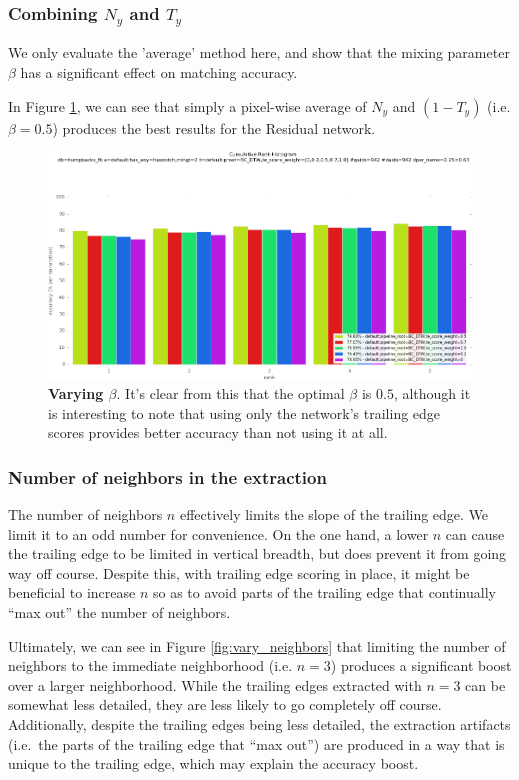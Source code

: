 \subsubsection{Combining $N_y$ and $T_y$}

We only evaluate the 'average' method here, and show that the mixing parameter $\beta$ has a significant effect on matching accuracy.

In Figure \ref{fig:vary_te_weight}, we can see that simply a pixel-wise average of $N_y$ and $(1-T_y)$ (i.e. $\beta = 0.5$) produces the best results for the Residual network.

\begin{figure}[t]%
\centering
\includegraphics[width=1\textwidth]{../images/results/vary_te_weight.png}
\caption[]{\textbf{Varying $\beta$}. It's clear from this that the optimal $\beta$ is $0.5$, although it is interesting to note that using only the network's trailing edge scores provides better accuracy than not using it at all.}
\label{fig:vary_te_weight}
\end{figure}


\subsubsection{Number of neighbors in the extraction}

The number of neighbors $n$ effectively limits the slope of the trailing edge.
We limit it to an odd number for convenience.
On the one hand, a lower $n$ can cause the trailing edge to be limited in vertical breadth, but does prevent it from going way off course.
Despite this, with trailing edge scoring in place, it might be beneficial to increase $n$ so as to avoid parts of the trailing edge that continually ``max out'' the number of neighbors.

Ultimately, we can see in Figure \ref{fig:vary_neighbors} that limiting the number of neighbors to the immediate neighborhood (i.e. $n = 3$) produces a significant boost over a larger neighborhood.
While the trailing edges extracted with $n = 3$ can be somewhat less detailed, they are less likely to go completely off course.
Additionally, despite the trailing edges being less detailed, the extraction artifacts (i.e.\ the parts of the trailing edge that ``max out'') are produced in a way that is unique to the trailing edge, which may explain the accuracy boost.

